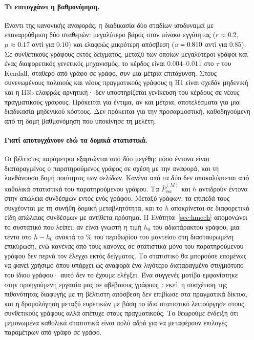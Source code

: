 \documentclass[11pt,a4paper]{article}
\theoremstyle{definition}
\theoremstyle{remark}
\newcommand{\Pbar}{\bar P^{(M)}_{\mathrm{esc}}}
\begin{document}
\paragraph{Τι επιτυγχάνει η βαθμονόμηση.} Έναντι της κανονικής αναφοράς, η διαδικασία δύο σταδίων
ισοδυναμεί με επαναρρύθμιση δύο σταθερών: μεγαλύτερο βάρος στον πίνακα εγγύτητας ($r\approx0.2$,
$\mu\approx0.17$ αντί για $0.10$) και ελαφρώς μικρότερη απόσβεση ($\alpha=0.810$ αντί για
$0.85$). Σε συνθετικούς γράφους εκτός δείγματος, μεταξύ των οποίων μεγαλύτεροι γράφοι και ένας
διαφορετικός γενετικός μηχανισμός, το κέρδος είναι $0.004$--$0.011$ στο $\tau$ του Kendall, σταθερό
από γράφο σε γράφο, συν μια μέτρια επιτάχυνση. Στους συνενωμένους παλαιούς και νέους πραγματικούς
γράφους η H1 είναι σχεδόν μηδενική και η H3b ελαφρώς αρνητική· δεν υποστηρίζεται γενίκευση του
κέρδους σε νέους πραγματικούς γράφους. Πρόκειται για έντιμα, αν και μέτρια, αποτελέσματα για μια διαδικασία μηδενικού κόστους. Δεν
πρόκειται για την προσαρμοστική, καθοδηγούμενη από τη δομή βαθμονόμηση που υποκίνησε τη μελέτη.

\paragraph{Γιατί αποτυγχάνουν εδώ τα δομικά στατιστικά.} Οι βέλτιστες παράμετροι εξαρτώνται από δύο
μεγέθη: πόσο έντονα είναι διαταραγμένος ο παρατηρούμενος γράφος σε σχέση με την αναφορά, και τη
λανθάνουσα δομή ποιότητας των σελίδων. Κανένα από τα δύο δεν αποκαλύπτεται από καθολικά στατιστικά του
παρατηρούμενου γράφου. Τα $\Pbar$ και $h$ αντιδρούν έντονα στην απώλεια συνδέσμων εντός ενός γράφου.
Μεταξύ γράφων, τα επίπεδά τους συγχέονται με τη συνήθη δομική μεταβλητότητα, και το $h$ αποκρίνεται σε
διαφορετικά είδη απώλειας συνδέσμων με αντίθετα πρόσημα. Η Ενότητα~\ref{sec:hmech} απομονώνει το
συστατικό που λείπει: αν είναι γνωστή η τιμή $h_0$ του αδιατάρακτου γράφου, μια τέντα στο $h-h_0$
ανακτά το \NmDhShare\% του περιθωρίου του μαντείου στη διασταυρωμένη επικύρωση, ενώ κανένας από τους
\NmRules{} κανόνες σε στατιστικά μόνο του παρατηρούμενου γράφου δεν περνά τον έλεγχο εκτός δείγματος.
Το στατιστικό θα μπορούσε επομένως να φανεί χρήσιμο όπου υπάρχει ως αναφορά ένα λιγότερο διαταραγμένο
στιγμιότυπο του ίδιου γράφου· αυτό δεν το έχουμε ελέγξει.
Ένα συγγενές μοτίβο εμφανίστηκε στην
προηγούμενη εργασία μας σε αβέβαιους γράφους~\cite{konstantellos26}: εκεί, η συσχέτιση της πιθανότητας
διαφυγής με τη βέλτιστη απόσβεση δεν επιβίωσε στα πραγματικά δίκτυα, και η δρομολόγηση μεταξύ ευρετικών
με βάση το ίδιο στατιστικό λειτούργησε στους συνθετικούς γράφους αλλά απέτυχε στους πραγματικούς. Το
θεωρούμε ένδειξη ότι μεμονωμένα καθολικά στατιστικά είναι πολύ αδρά για να μεταφέρουν επιλογές
παραμέτρων από γράφο σε γράφο.
\end{document}

